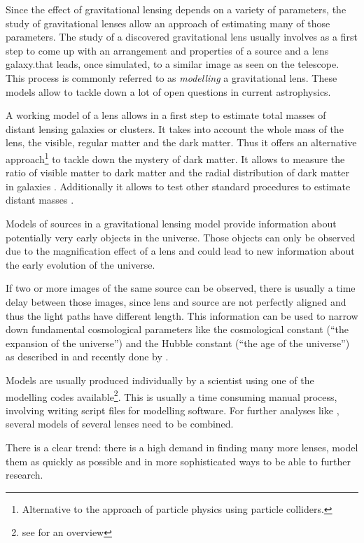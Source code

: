 \documentclass[11pt]{article}
\begin{document}
Since the effect of gravitational lensing depends on a variety of parameters, the study of gravitational lenses allow an approach of estimating many of those parameters.
The study of a discovered gravitational lens usually involves as a first step to come up with an arrangement and properties of a source and a lens galaxy.that leads, once simulated, to a similar image as seen on the telescope.
This process is commonly referred to as \emph{modelling} a gravitational lens.
These models allow to tackle down a lot of open questions in current astrophysics.

A working model of a lens allows in a first step to estimate total masses of distant lensing galaxies or clusters.
It takes into account the whole mass of the lens, the visible, regular matter and the dark matter\cite{kochanek1995there}.
Thus it offers an alternative approach\footnote{Alternative to the approach of particle physics using particle colliders.} to tackle down the mystery of dark matter.
It allows to measure the ratio of visible matter to dark matter and the radial distribution of dark matter in galaxies \cite{treukoop04}.
Additionally it allows to test other standard procedures to estimate distant masses \cite{kochanek1995there}.

Models of sources in a gravitational lensing model provide information about potentially very early objects in the universe.
Those objects can only be observed due to the magnification effect of a lens and could lead to new information about the early evolution of the universe\cite{rusin03}.

If two or more images of the same source can be observed, there is usually a time delay between those images, since lens and source are not perfectly aligned and thus the light paths have different length.
This information can be used to narrow down fundamental cosmological parameters like the cosmological constant (``the expansion of the universe'') and the Hubble constant (``the age of the universe'') as described in \cite{refsdal1964} and recently done by \cite{age_uni}.


Models are usually produced individually by a scientist using one of the modelling codes available\footnote{see \cite{overview_soft2013} for an overview}.
This is usually a time consuming manual process, involving writing script files for modelling software.
For further analyses like \cite{age_uni}, several models of several lenses need to be combined.

There is a clear trend: there is a high demand in finding many more lenses, model them as quickly as possible and in more sophisticated ways to be able to further research.
\end{document}
